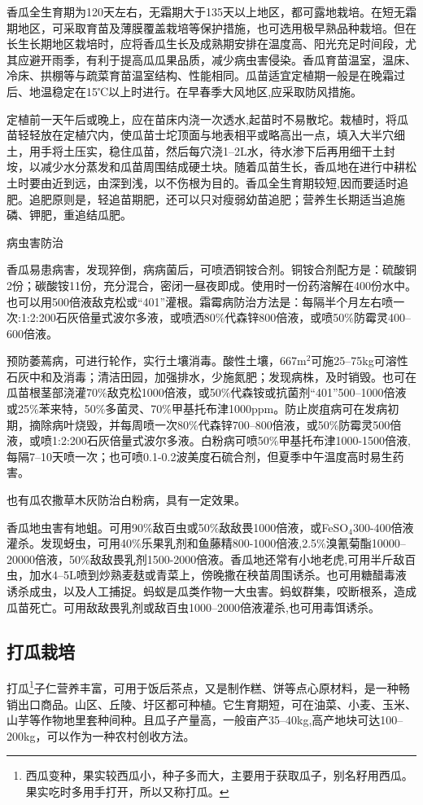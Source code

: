 \documentclass{ctexbook}
\begin{document}
香瓜全生育期为120天左右，无霜期大于135天以上地区，都可露地栽培。在短无霜期地区，可采取育苗及薄膜覆盖栽培等保护措施，也可选用极早熟品种栽培。但在长生长期地区栽培时，应将香瓜生长及成熟期安排在温度高、阳光充足时间段，尤其应避开雨季，有利于提高瓜瓜果品质，减少病虫害侵染。香瓜育苗温室，温床、冷床、拱棚等与疏菜育苗温室结构、性能相同。瓜苗适宜定植期一般是在晚霜过后、地温稳定在15℃以上时进行。在早春季大风地区,应采取防风措施。

定植前一天午后或晚上，应在苗床内浇一次透水,起苗时不易散坨。栽植时，将瓜苗轻轻放在定植穴内，使瓜苗士坨顶面与地表相平或略高出一点，填入大半穴细土，用手将土压实，稳住瓜苗，然后每穴浇1--2L水，待水渗下后再用细干土封垵，以减少水分蒸发和瓜苗周围结成硬土块。随着瓜苗生长，香瓜地在进行中耕松土时要由近到远，由深到浅，以不伤根为目的。香瓜全生育期较短,因而要适时追肥。追肥原则是，轻追苗期肥，还可以只对瘦弱幼苗追肥；营养生长期适当追施磷、钾肥，重追结瓜肥。

病虫害防治

香瓜易患病害，发现猝倒，病病菌后，可喷洒铜铵合剂。铜铵合剂配方是：硫酸铜2份；碳酸铵11份，充分混合，密闭一昼夜即成。使用时一份药溶解在400份水中。也可以用500倍液敌克松或“401”灌根。霜霉病防治方法是：每隔半个月左右喷一次:1:2:200石灰倍量式波尔多液，或喷洒80\%代森锌800倍液，或喷50\%防霉灵400--600倍液。

预防萎蔫病，可进行轮作，实行土壤消毒。酸性土壤，667m$^2$可施25--75kg可溶性石灰中和及消毒；清洁田园，加强排水，少施氮肥；发现病株，及时销毁。也可在瓜苗根茎部浇灌70\%敌克松1000倍液，或50\%代森铵或抗菌剂“401”500--1000倍液或25\%苯来特，50\%多菌灵、70\%甲基托布津1000ppm。防止炭疽病可在发病初期，摘除病叶烧毁，并每周喷一次80\%代森锌700--800倍液，或50\%防霉灵500倍液，或喷1:2:200石灰倍量式波尔多液。白粉病可喷50\%甲基托布津1000-1500倍液,每隔7--10天喷一次；也可喷0.1-0.2波美度石硫合剂，但夏季中午温度高时易生药害。

也有瓜农撒草木灰防治白粉病，具有一定效果。

香瓜地虫害有地蛆。可用90\%敌百虫或50\%敌敌畏1000倍液，或FeSO$_4$300-400倍液灌杀。发现蚜虫，可用40\%乐果乳剂和鱼藤精800-1000倍液,2.5\%溴氰菊酯10000--20000倍液，50\%敌敌畏乳剂1500-2000倍液。香瓜地还常有小地老虎,可用半斤敌百虫，加水4--5L喷到炒熟麦麸或青菜上，傍晚撒在秧苗周围诱杀。也可用糖醋毒液诱杀成虫，以及人工捕捉。蚂蚁是瓜类作物一大虫害。蚂蚁群集，咬断根系，造成瓜苗死亡。可用敌敌畏乳剂或敌百虫1000--2000倍液灌杀,也可用毒饵诱杀。
\subsection{打瓜栽培}
打瓜\footnote{西瓜变种，果实较西瓜小，种子多而大，主要用于获取瓜子，别名籽用西瓜。果实吃时多用手打开，所以又称打瓜。}子仁营养丰富，可用于饭后茶点，又是制作糕、饼等点心原材料，是一种畅销出口商品。山区、丘陵、圩区都可种植。它生育期短，可在油菜、小麦、玉米、山芋等作物地里套种间种。且瓜子产量高，一般亩产35--40kg,高产地块可达100--200kg，可以作为一种农村创收方法。
\end{document}
